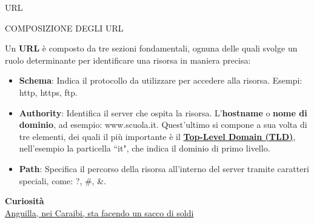 \documentclass[aspectratio=1610]{beamer}
\begin{document}
\begin{frame}{URL}
    \begin{alertblock}{COMPOSIZIONE DEGLI URL}
        \begin{minipage}{0.98\linewidth}
            \justifying
            Un \textbf{URL} è composto da tre sezioni fondamentali, ognuna delle quali svolge un ruolo determinante per identificare una risorsa in maniera precisa:
            \begin{itemize}
                \pause
                \item \textbf{Schema}: Indica il protocollo da utilizzare per accedere alla risorsa. Esempi: http, https, ftp.
                \pause
                \item \textbf{Authority}: Identifica il server che ospita la risorsa. L'\textbf{hostname} o \textbf{nome di dominio}, ad esempio: www.scuola.it. 
                Quest'ultimo si compone a sua volta di tre elementi, dei quali il più importante è il \textbf{\href{https://it.wikipedia.org/wiki/Dominio\_di\_primo\_livello}{Top-Level Domain (TLD)}}, nell'esempio la particella ``it", 
                che indica il dominio di primo livello. 
                \pause
                \item \textbf{Path}: Specifica il percorso della risorsa all'interno del server tramite caratteri speciali, come: ?, \#, \&.
            \end{itemize}
            \bigskip
            \tiny{\textbf{Curiosità}}\\
            \tiny{\href{https://www.ilpost.it/2023/10/07/domini-siti-web-anguilla-tuvalu/}{Anguilla, nei Caraibi, sta facendo un sacco di soldi}}
        \end{minipage}
    \end{alertblock}
\end{frame}
\end{document}
